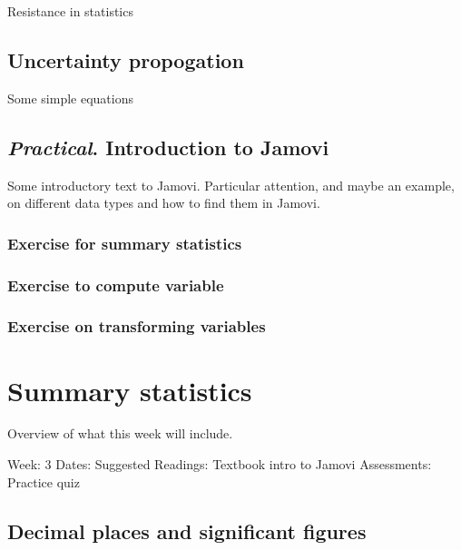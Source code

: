 \documentclass[
]{book}
\begin{document}
Resistance in statistics

\hypertarget{uncertainty-propogation}{%
\chapter{Uncertainty propogation}\label{uncertainty-propogation}}

Some simple equations

\hypertarget{practical.-introduction-to-jamovi}{%
\chapter{\texorpdfstring{\emph{Practical}. Introduction to Jamovi}{Practical. Introduction to Jamovi}}\label{practical.-introduction-to-jamovi}}

Some introductory text to Jamovi. Particular attention, and maybe an example, on different data types and how to find them in Jamovi.

\hypertarget{exercise-for-summary-statistics}{%
\section{Exercise for summary statistics}\label{exercise-for-summary-statistics}}

\hypertarget{exercise-to-compute-variable}{%
\section{Exercise to compute variable}\label{exercise-to-compute-variable}}

\hypertarget{exercise-on-transforming-variables}{%
\section{Exercise on transforming variables}\label{exercise-on-transforming-variables}}

\hypertarget{part-summary-statistics}{%
\part{Summary statistics}\label{part-summary-statistics}}

Overview of what this week will include.

Week: 3
Dates:
Suggested Readings: Textbook intro to Jamovi
Assessments: Practice quiz

\hypertarget{decimal-places-and-significant-figures}{%
\chapter{Decimal places and significant figures}\label{decimal-places-and-significant-figures}}
\end{document}
